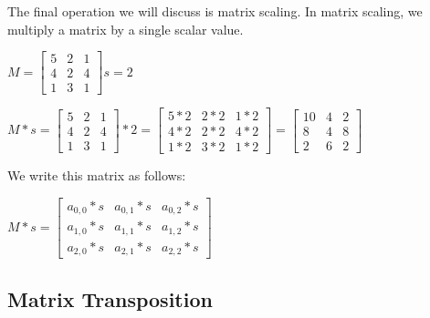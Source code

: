 \documentclass[12pt]{article}
\begin{document}
The final operation we will discuss is matrix scaling. In matrix scaling, we multiply a matrix by a single scalar value.
\begin{center}
$M = \begin{bmatrix} 5 & 2 & 1 \\ 4 & 2 & 4 \\ 1 & 3 & 1 \end{bmatrix}
  s = 2
$
\end{center}
\begin{center}
$M * s =
 \begin{bmatrix} 5 & 2 & 1 \\ 4 & 2 & 4 \\ 1 & 3 & 1 \end{bmatrix}  *
  2 = 
  \begin{bmatrix} 5 * 2 & 2 * 2 & 1 * 2 \\ 
                           4 * 2 & 2 * 2 & 4 * 2 \\ 
                           1 * 2 & 3 * 2 & 1 * 2
  \end{bmatrix} =
  \begin{bmatrix} 10 & 4 & 2 \\ 8 & 4 & 8 \\ 2 & 6 & 2 \end{bmatrix}
$
\end{center}
We write this matrix as follows:
\begin{center}
$M * s=
 \begin{bmatrix} a_{0, 0} * s & a_{0, 1} * s & a_{0, 2} * s \\
 		         a_{1, 0} * s & a_{1, 1} * s & a_{1, 2} * s \\
		         a_{2, 0} * s & a_{2, 1} * s & a_{2, 2} * s
 \end{bmatrix}
$
\end{center}

\subsection{Matrix Transposition}
\end{document}
